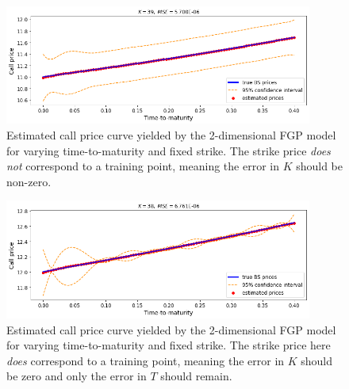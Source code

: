 \documentclass[a4paper,12pt]{article}
\begin{document}
\begin{figure} [H]
    \centering
    \includegraphics[width=0.9\textwidth]{fgp_2d_varying_T_K=39.png}
    \caption{Estimated call price curve yielded by the 2-dimensional FGP model for varying time-to-maturity and fixed strike. The strike price \textit{does not} correspond to a training point, meaning the error in $K$ should be non-zero.}
    \label{fig:fgp_2d_varying_T_K=39}
\end{figure}
\begin{figure} [H]
    \centering
    \includegraphics[width=0.9\textwidth]{fgp_2d_varying_T_K=38.png}
    \caption{Estimated call price curve yielded by the 2-dimensional FGP model for varying time-to-maturity and fixed strike. The strike price here \textit{does} correspond to a training point, meaning the error in $K$ should be zero and only the error in $T$ should remain.}
    \label{fig:fgp_2d_varying_T_K=38}
\end{figure}
\end{document}
